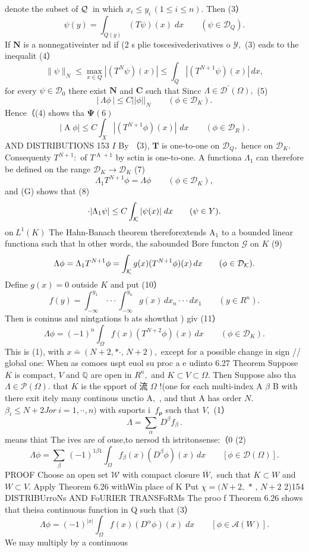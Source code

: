 denote the subset of ${\cal Q}\,$ in which $x_{i}\leq y_{i}\,(1\leq i\leq n).$ Then (3） $$ \psi(y)=\int_{Q(y)}(T\psi)(x)\;d x\qquad(\psi\in{\mathcal{D}}_{Q}). $$ If ${\boldsymbol{N}}$ is a nonnegativeinter nd if (2 s plie toscesivederivatives o ${\mathcal{Y}},$ (3) eads to the inequalit (4） $$ \|\psi\|_{N}\leq\operatorname*{max}_{x\in Q}|(T^{N}\psi)(x)|\leq\int_{Q}|(T^{N+1}\psi)(x)|\,d x, $$ for every $\psi\in{\mathcal{D}}_{0}$ there exist ${\boldsymbol{N}}$ and ${\boldsymbol{C}}$ such that Sincc $\Lambda\in{\mathcal{D}}^{\prime}(\Omega),$ (5) $$ \big|\,\Lambda\phi\,\big|\leq C||\phi||_{N}\qquad(\phi\in\mathcal{D}_{K}). $$ Hence（(4) shows tha $\mathbf{\Psi}(6)$ $$ |\operatorname{A}\phi|\leq C\int_{X}|(T^{N+1}\phi)(x)|\,\,d x\qquad(\phi\in{\mathcal{D}}_{R}). $$AND DISTRIBUTIONS 153 $\boldsymbol{\mathit{I}}$ By （3), ${\boldsymbol{T}}$ is one-to-one on ${\mathcal{D}}_{Q},$ hence on ${\mathcal{D}}_{K}.$ Consequenty $T^{N+1}{\mathrm{:}}$ of $\scriptstyle{T^{\operatorname{A}+1}}$ by sctin is one-to-one. A functiona $\Lambda_{1}$ can therefore be defined on the range ${\mathcal{D}}_{K}\to{\mathcal{D}}_{K}$ (7) $$ \Lambda_{1}T^{N+1}\phi=\Lambda\phi\qquad(\phi\in{\mathcal D}_{K}), $$ and (G) shows that (8) $$ \cdot|\Lambda_{1}\psi|\leq C\int_{\cal K}|\psi(x)|\;d x\qquad(\psi\in Y). $$ $\mathrm{on}\ L^{1}(K)$ The Hahn-Banach theorem thereforextends $\mathrm{A}_{1}$ to a bounded linear functiona such that ln other words, the sabounded Bore functon ${\mathcal{G}}$ on $\textstyle K$ (9) $$ \Lambda\phi=\Lambda_{1}T^{N+1}\phi=\int_{\cal K}g(x)(T^{N+1}\phi)(x)\,d x\qquad(\phi\in{\mathcal D}_{\cal K}). $$ Define $g(x)=0$ outside $K$ and put (10） $$ f(y)=\int_{-\infty}^{y_{1}}\cdot\cdot\cdot\int_{-\infty}^{y_{n}}g(x)\,d x_{n}\cdot\cdot\cdot d x_{1}\qquad(y\in R^{n}). $$ Then is coninus and nintgations b ats showthat ) giv (11） $$ \Lambda\phi=(-1)^{n}\int_{\Omega}f(x)(T^{N+2}\phi)(x)\,d x\qquad(\phi\in{\mathcal{D}}_{K}). $$ This is (1), with $x\doteq(N+2,\ast\cdot,\,N+2),$ except for a possible change in sign // global one: When as comoes uspt euol su proc a e udinto 6.27 Theorem Suppose $\textstyle K$ is compact, ${\mathbf{}}V$ and $\mathbb{Q}$ are open in $R^{n},$ and $K\subset V\subset\Omega.$ Then Suppose also tha $\Lambda\in\mathcal{P}(\Omega).$ that $\textstyle K$ is the spport of 流 $\Omega$ !(one for each multi-index A $\beta$ B with there exit itely many continous unctio $\mathrm{A,}$ , and thut A has order $N.$ $\beta_{i}\leq N+2J o r\ i=1,\cdot\cdot,n)$ with suports i $\ f_{\boldsymbol{\rho}}$ such that ${\mathit{V}},$ (1） $$ \Lambda=\sum_{\alpha}\ D^{\beta}f_{\beta}\,. $$ means thiat The ives are of ouse,to nersod th istritonsense:（0 (2) $$ \Lambda\phi=\sum_{\beta}\,(-1)^{1\beta1}{\int_{\Omega}f_{\beta}(x)(D^{\beta}\phi)(x)\,d x}\qquad[\phi\in{\mathcal{D}}(\Omega)]. $$ PROOF Choose an open set ${\mathcal{W}}$ with compact closure ${\overline{{W}}},$ such that $K\subset W$ and $W\subset V.$ Apply Theorem 6.26 withWin place of K Put $\chi=(N+2,\,\ast\,,\,N+2$ 2)154 DISTRIBUrroNs AND FoURIER TRANSFoRMs The proo f Theorem 6.26 shows that theisa continuous function in Q such that (3） $$ \Lambda\phi=(-1)^{|x|}{\int_{\Omega}f(x)(D^{\alpha}\phi)(x)\;d x}\qquad[\phi\in{\mathcal{A}}(W)]. $$ We may multiply by a continuous 